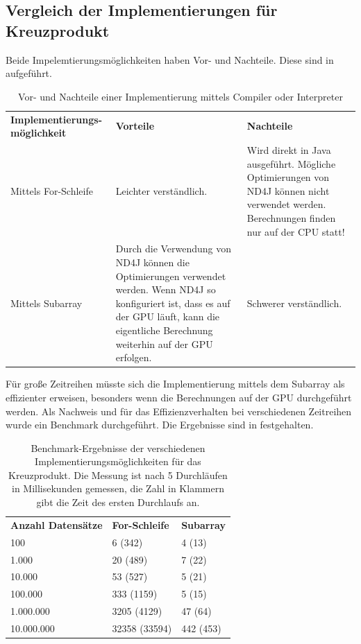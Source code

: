 \subsection{Vergleich der Implementierungen für Kreuzprodukt}
Beide Impelemtierungsmöglichkeiten haben Vor- und Nachteile.
Diese sind in  aufgeführt.
\begin{table}[H]
	\centering
	\begin{tabular}{ | p{4cm} | p{5.5cm} | p{5.5cm} | }
		\hline \rowcolor{gray!15}
		\textbf{Implementierungs-möglichkeit} & \textbf{Vorteile} & \textbf{Nachteile} \\ \hhline{|=|=|=|}
		Mittels For-Schleife & Leichter verständlich. & Wird direkt in Java ausgeführt. \newline Mögliche Optimierungen von ND4J können nicht verwendet werden. Berechnungen finden nur auf der \ac{CPU} statt! \\ \hline
		Mittels Subarray & Durch die Verwendung von ND4J können die Optimierungen verwendet werden. Wenn ND4J so konfiguriert ist, dass es auf der \ac{GPU} läuft, kann die eigentliche Berechnung weiterhin auf der \ac{GPU} erfolgen. & Schwerer verständlich. \\ \hline
	\end{tabular}
	\caption{Vor- und Nachteile einer Implementierung mittels Compiler oder Interpreter}
	\label{tab:Vorteile_Kreuzprodukt_Implementierungen}
\end{table}

\noindent Für große Zeitreihen müsste sich die Implementierung mittels dem Subarray als effizienter erweisen, besonders wenn die Berechnungen auf der \ac{GPU} durchgeführt werden.
Als Nachweis und für das Effizienzverhalten bei verschiedenen Zeitreihen wurde ein Benchmark durchgeführt.
Die Ergebnisse sind in  festgehalten.

\begin{table}[H]
	\centering
	\begin{tabular}{ | p{5cm} | p{3.5cm} | p{3.5cm} | }
		\hline \rowcolor{gray!15}
		\textbf{Anzahl Datensätze} & \textbf{For-Schleife} & \textbf{Subarray} \\ \hhline{|=|=|=|}
		100 & 6 (342) & 4 (13) \\ \hline
		1.000 & 20 (489) & 7 (22) \\ \hline
		10.000 & 53 (527) & 5 (21) \\ \hline
		100.000 & 333 (1159) & 5 (15) \\ \hline
		1.000.000 & 3205 (4129) & 47 (64) \\ \hline
		10.000.000 & 32358 (33594) & 442 (453) \\ \hline

	\end{tabular}
	\caption[Benchmark-Ergebnisse der verschiedenen Implementierungsmöglichkeiten für das Kreuzprodukt]
	{Benchmark-Ergebnisse der verschiedenen Implementierungsmöglichkeiten für das Kreuzprodukt. Die Messung ist nach 5 Durchläufen in Millisekunden gemessen, die Zahl in Klammern gibt die Zeit des ersten Durchlaufs an.}
	\label{tab:Benchmark_Kreuzprodukt_Implementierung}
\end{table}


